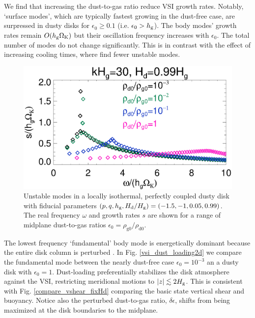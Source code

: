 We find that increasing the dust-to-gas ratio reduce VSI growth
rates. Notably, `surface modes', which are typically fastest growing in
the dust-free case, are surpressed in dusty disks for $\epsilon_0\geq
0.1$ (i.e. $\epsilon_0> h_\mathrm{g}$).  
The body modes' growth rates remain $ O(h_\mathrm{g}\Omega_{\rm K})$ 
but their oscillation frequency increases with
$\epsilon_0$. %
The total number of modes do not change
significantly. This is in contrast with the effect of increasing
cooling times, where  find fewer unstable modes.

\begin{figure}
  \includegraphics[width=\linewidth]{figures/compare_eigenvals_kx30Hd1} 
  \caption{Unstable modes in a locally isothermal, perfectly coupled
    dusty disk with fiducial parameters
    $(p,q,h_\mathrm{g}, H_\mathrm{d}/H_\mathrm{g} )=(-1.5,-1,0.05, 0.99)$. The real
    frequency $\omega$ and growth rates $s$ are shown for a range of
    midplane dust-to-gas ratios $\epsilon_0=\rho_\mathrm{g0}/\rho_\mathrm{d0}$. 
    \label{vsi_dust_loading}
    }
\end{figure}

The lowest frequency `fundamental' body mode is energetically dominant
because the entire disk column is perturbed \citep[cf. surface modes
  which only disturb the disk boundaries,][]{umurhan16c}. In Fig. \ref{vsi_dust_loading2d}
we compare the fundamental mode between the nearly 
dust-free case $\epsilon_0=10^{-3}$ an a dusty disk with
$\epsilon_0=1$. Dust-loading preferentially
stabilizes the disk atmosphere against the VSI, restricting
meridional motions to $|z|\lesssim 2H_\mathrm{g}$. 
This is consistent with Fig. \ref{compare_vshear_fixHd} comparing the basic state vertical
shear and buoyancy. Notice also the perturbed dust-to-gas ratio,
$\delta\epsilon$, shifts from being maximized at the disk boundaries
to the midplane.  

